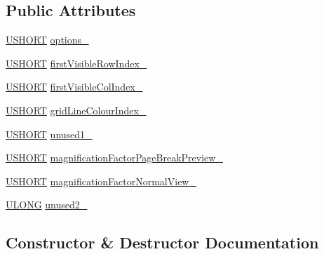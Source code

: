 \subsection*{Public Attributes}
\begin{DoxyCompactItemize}
\item 
\hyperlink{_basic_excel_8hpp_a5850d5316caf7f4cedd742fdf8cd7c02}{U\+S\+H\+O\+R\+T} \hyperlink{struct_y_excel_1_1_worksheet_1_1_window2_a51840b5acff08f0ac3b10cfd8ae42282}{options\+\_\+}
\item 
\hyperlink{_basic_excel_8hpp_a5850d5316caf7f4cedd742fdf8cd7c02}{U\+S\+H\+O\+R\+T} \hyperlink{struct_y_excel_1_1_worksheet_1_1_window2_a507e7bc50e589bfa9d451d510244f4e7}{first\+Visible\+Row\+Index\+\_\+}
\item 
\hyperlink{_basic_excel_8hpp_a5850d5316caf7f4cedd742fdf8cd7c02}{U\+S\+H\+O\+R\+T} \hyperlink{struct_y_excel_1_1_worksheet_1_1_window2_ae8d6f46ae86b02b27a51d798f80192d8}{first\+Visible\+Col\+Index\+\_\+}
\item 
\hyperlink{_basic_excel_8hpp_a5850d5316caf7f4cedd742fdf8cd7c02}{U\+S\+H\+O\+R\+T} \hyperlink{struct_y_excel_1_1_worksheet_1_1_window2_a9fa468fb844221b52569c690fe52b048}{grid\+Line\+Colour\+Index\+\_\+}
\item 
\hyperlink{_basic_excel_8hpp_a5850d5316caf7f4cedd742fdf8cd7c02}{U\+S\+H\+O\+R\+T} \hyperlink{struct_y_excel_1_1_worksheet_1_1_window2_aba71ea720816430074677cb8cf66d817}{unused1\+\_\+}
\item 
\hyperlink{_basic_excel_8hpp_a5850d5316caf7f4cedd742fdf8cd7c02}{U\+S\+H\+O\+R\+T} \hyperlink{struct_y_excel_1_1_worksheet_1_1_window2_a73bf519c252e3d2ffbb4544d6b3cb15a}{magnification\+Factor\+Page\+Break\+Preview\+\_\+}
\item 
\hyperlink{_basic_excel_8hpp_a5850d5316caf7f4cedd742fdf8cd7c02}{U\+S\+H\+O\+R\+T} \hyperlink{struct_y_excel_1_1_worksheet_1_1_window2_a05d799a6e5c04363654fad46944c6b23}{magnification\+Factor\+Normal\+View\+\_\+}
\item 
\hyperlink{_basic_excel_8hpp_abe09d1bea023be6a07cbadde8e955435}{U\+L\+O\+N\+G} \hyperlink{struct_y_excel_1_1_worksheet_1_1_window2_af1aedfa4d819a2ba21b1e44f2146fbe1}{unused2\+\_\+}
\end{DoxyCompactItemize}


\subsection{Constructor \& Destructor Documentation}
\hypertarget{struct_y_excel_1_1_worksheet_1_1_window2_a5618e3a35f63f57c6dce259ed498e657}{}
